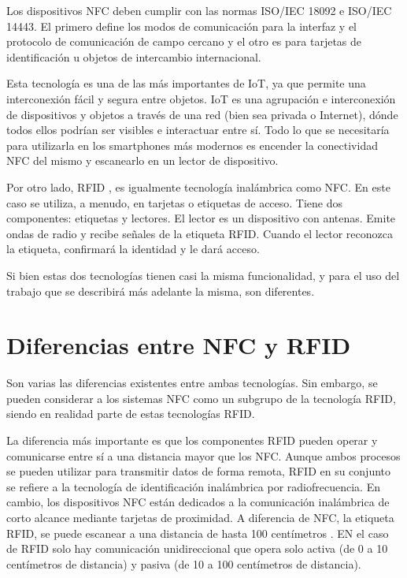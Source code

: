 \documentclass[12pt,a4paper,onecolumn,oneside]{report}
\begin{document}
Los dispositivos NFC deben cumplir con las normas ISO/IEC 18092 e ISO/IEC 14443. El primero define los modos de comunicación para la interfaz y el protocolo de comunicación de campo cercano y el otro es para tarjetas de identificación u objetos de intercambio internacional.

Esta tecnología es una de las más importantes de IoT, ya que permite una interconexión fácil y segura entre objetos. IoT es una agrupación e interconexión de dispositivos y objetos a través de una red (bien sea privada o Internet), dónde todos ellos podrían ser visibles e interactuar entre sí. Todo lo que se necesitaría para utilizarla en los smartphones más modernos es encender la conectividad NFC del mismo y escanearlo en un lector de dispositivo.

Por otro lado, RFID , es igualmente tecnología inalámbrica como NFC. En este caso se utiliza, a menudo, en tarjetas o etiquetas de acceso. Tiene dos componentes: etiquetas y lectores. El lector es un dispositivo con antenas. Emite ondas de radio y recibe señales de la etiqueta RFID. Cuando el lector reconozca la etiqueta, confirmará la identidad y le dará acceso. 

Si bien estas dos tecnologías tienen casi la misma funcionalidad, y para el uso del trabajo que se describirá más adelante la misma, son diferentes. 


\section{Diferencias entre NFC y RFID}
\label{Diferencias entre NFC y RFID}

Son varias las diferencias existentes entre ambas tecnologías. Sin embargo, se pueden considerar a los sistemas NFC como un subgrupo de la tecnología RFID, siendo en realidad parte de estas tecnologías RFID.

La diferencia más importante es que los componentes RFID pueden operar y comunicarse entre sí a una distancia mayor que los NFC. Aunque ambos procesos se pueden utilizar para transmitir datos de forma remota, RFID en su conjunto se refiere a la tecnología de identificación inalámbrica por radiofrecuencia. En cambio, los dispositivos NFC están dedicados a la comunicación inalámbrica de corto alcance mediante tarjetas de proximidad. A diferencia de NFC, la etiqueta RFID, se puede escanear a una distancia de hasta 100 centímetros \cite{dos}. EN el caso de RFID solo hay comunicación unidireccional que opera solo activa (de 0 a 10 centímetros de distancia) y pasiva (de 10 a 100 centímetros de distancia).
\end{document}
